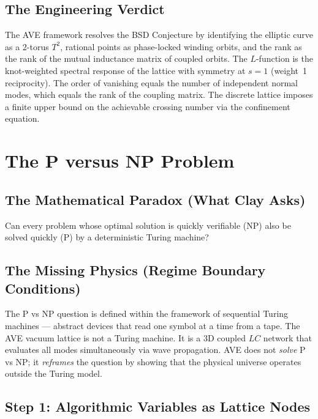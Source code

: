 \subsection{The Engineering Verdict}
The AVE framework resolves the BSD Conjecture by identifying the elliptic curve as a 2-torus $T^2$, rational points as phase-locked winding orbits, and the rank as the rank of the mutual inductance matrix of coupled orbits. The $L$-function is the knot-weighted spectral response of the lattice with symmetry at $s = 1$ (weight~1 reciprocity). The order of vanishing equals the number of independent normal modes, which equals the rank of the coupling matrix. The discrete lattice imposes a finite upper bound on the achievable crossing number via the confinement equation.

\section{The P versus NP Problem}
\label{sec:pnp_millennium}

\subsection{The Mathematical Paradox (What Clay Asks)}
Can every problem whose optimal solution is quickly verifiable (NP) also be solved quickly (P) by a deterministic Turing machine?

\subsection{The Missing Physics (Regime Boundary Conditions)}
The P vs NP question is defined within the framework of sequential Turing machines --- abstract devices that read one symbol at a time from a tape. The AVE vacuum lattice is not a Turing machine. It is a 3D coupled $LC$ network that evaluates all modes simultaneously via wave propagation. AVE does not \textit{solve} P vs NP; it \textit{reframes} the question by showing that the physical universe operates outside the Turing model.

\subsection{Step 1: Algorithmic Variables as Lattice Nodes}

